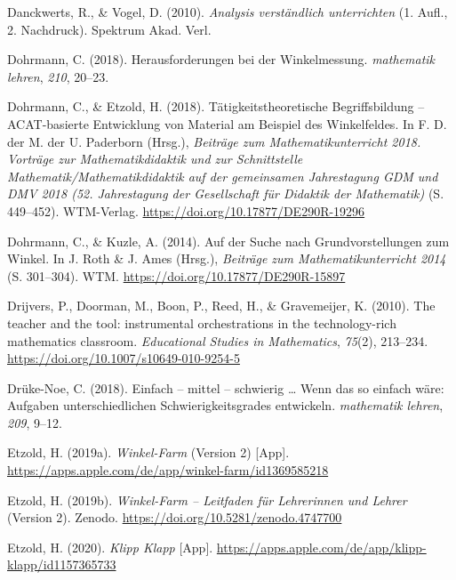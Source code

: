 \documentclass[
]{scrbook}
\newlength{\cslhangindent}
\newlength{\cslentryspacingunit} %
\newenvironment{CSLReferences}[2] %
 {%
  \setlength{\parindent}{0pt}
  \ifodd #1
  \let\oldpar\par
  \def\par{\hangindent=\cslhangindent\oldpar}
  \fi
  \setlength{\parskip}{#2\cslentryspacingunit}
 }%
 {}
\theoremstyle{definition}
\theoremstyle{definition}
\theoremstyle{definition}
\theoremstyle{definition}
\theoremstyle{remark}
\begin{document}
\begin{CSLReferences}{1}{0}
\leavevmode{}%
Danckwerts, R., \& Vogel, D. (2010). \emph{Analysis verständlich unterrichten} (1. Aufl., 2. Nachdruck). Spektrum Akad. Verl.

\leavevmode{}%
Dohrmann, C. (2018). Herausforderungen bei der {Winkelmessung}. \emph{mathematik lehren}, \emph{210}, 20--23.

\leavevmode{}%
Dohrmann, C., \& Etzold, H. (2018). Tätigkeitstheoretische {Begriffsbildung} -- {ACAT}-basierte {Entwicklung} von {Material} am {Beispiel} des {Winkelfeldes}. In F. D. der M. der U. Paderborn (Hrsg.), \emph{Beiträge zum {Mathematikunterricht} 2018. {Vorträge} zur {Mathematikdidaktik} und zur {Schnittstelle} {Mathematik}/{Mathematikdidaktik} auf der gemeinsamen {Jahrestagung} {GDM} und {DMV} 2018 (52. {Jahrestagung} der {Gesellschaft} für {Didaktik} der {Mathematik})} (S. 449--452). WTM-Verlag. \url{https://doi.org/10.17877/DE290R-19296}

\leavevmode{}%
Dohrmann, C., \& Kuzle, A. (2014). Auf der {Suche} nach {Grundvorstellungen} zum {Winkel}. In J. Roth \& J. Ames (Hrsg.), \emph{Beiträge zum {Mathematikunterricht} 2014} (S. 301--304). WTM. \url{https://doi.org/10.17877/DE290R-15897}

\leavevmode{}%
Drijvers, P., Doorman, M., Boon, P., Reed, H., \& Gravemeijer, K. (2010). The teacher and the tool: instrumental orchestrations in the technology-rich mathematics classroom. \emph{Educational Studies in Mathematics}, \emph{75}(2), 213--234. \url{https://doi.org/10.1007/s10649-010-9254-5}

\leavevmode{}%
Drüke-Noe, C. (2018). Einfach -- mittel -- schwierig \ldots{} {Wenn} das so einfach wäre: {Aufgaben} unterschiedlichen {Schwierigkeitsgrades} entwickeln. \emph{mathematik lehren}, \emph{209}, 9--12.

\leavevmode{}%
Etzold, H. (2019a). \emph{Winkel-{Farm}} (Version 2) {[}App{]}. \url{https://apps.apple.com/de/app/winkel-farm/id1369585218}

\leavevmode{}%
Etzold, H. (2019b). \emph{Winkel-{Farm} -- {Leitfaden} für {Lehrerinnen} und {Lehrer}} (Version 2). Zenodo. \url{https://doi.org/10.5281/zenodo.4747700}

\leavevmode{}%
Etzold, H. (2020). \emph{Klipp {Klapp}} {[}App{]}. \url{https://apps.apple.com/de/app/klipp-klapp/id1157365733}


\end{CSLReferences}
\end{document}
